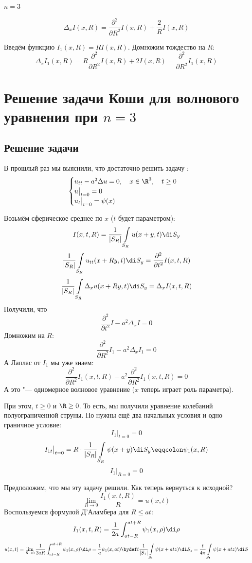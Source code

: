 \begin{statement}
	$ n = 3 $

	$$ \Delta_x I(x, R) = \frac{\partial^2}{\partial R^2} I(x, R) + \frac2R I(x, R) $$

	Введём функцию $ I_1(x, R) = R I(x, R) $.
	Домножим тождество на $ R $:
	$$ \Delta_x I_1(x, R) = R \frac{\partial^2}{\partial R^2} I(x, R) + 2I(x, R) =
	\frac{\partial^2}{\partial R^2} I_1(x, R) $$
\end{statement}

\section{Решение задачи Коши для волнового уравнения при \texorpdfstring{$ n = 3 $}{n = 3}}

\subsection{Решение задачи }

В прошлый раз мы выяснили, что достаточно решить задачу :
$$
\begin{cases}
	u_{tt} - a^2 \Delta u = 0, \quad x \in \R^3, \quad t \ge 0 \\
	u\bigr|_{t = 0} = 0 \\
	u_t\bigr|_{t = 0} = \psi(x)
\end{cases} $$

Возьмём сферическое среднее по $ x $ ($ t $ будет параметром):
$$ I(x, t, R) = \frac1{|S_R|} \int\limits_{S_R} u(x + y, t) \di S_y $$
$$ \frac1{|S_R|} \int\limits_{S_R} u_{tt} (x + Ry, t) \di S_y =
\frac{\partial^2}{\partial t^2} I(x, t, R) $$
$$ \frac1{|S_R|} \int\limits_{S_R} \Delta_x u(x + Ry, t) \di S_y = \Delta_x I(x, t, R) $$
Получили, что
$$ \frac{\partial^2}{\partial t^2} I - a^2 \Delta_x I = 0 $$
Домножим на $ R $:
$$ \frac{\partial^2}{\partial R^2} I_1 - a^2 \Delta_x I_1 = 0 $$
А Лаплас от $ I_1 $ мы уже знаем:
$$ \frac{\partial^2}{\partial R^2} I_1(x, t, R) -
a^2 \frac{\partial^2}{\partial R^2} I_1 (x, t, R) = 0 $$
А это "--- одномерное волновое уравнение ($ x $ теперь играет роль параметра).

При этом, $ t \ge 0 $ и $ \R \ge 0 $.
То есть, мы получили уравнение колебаний полуограниченной струны.
Но нужны ещё два начальных условия и одно граничное условие:
$$ I_1\bigr|_{t = 0} = 0 $$
$$ I_{1t}\bigr|_{t = 0} = R \cdot \frac1{|S_R|} \int\limits_{S_R} \psi(x + y) \di S_y \eqqcolon
\psi_1(x, R) $$
$$ I_1\bigr|_{R = 0} = 0 $$

Предположим, что мы эту задачу решили.
Как теперь вернуться к исходной?
$$ \lim\limits_{R \to 0} \frac{I_1(x, t, R)}R = u(x, t) $$
Воспользуемся формулой Д'Аламбера для $ R \le at $:
$$ I_1(x, t, R) = \frac1{2a} \int_{at - R}^{at + R} \psi_1(x, \rho) \di \rho $$
$$ u(x, t) = \lim\limits_{R \to 0} \frac1{2aR} \int_{at - R}^{at + R} \psi_1(x, \rho) \di \rho =
\frac1a \psi_1(x, at) \bydef t \frac1{|S_1|} \int\limits_{S_1} \psi(x + atz) \di S_z =
\frac{t}{4 \pi} \int\limits_{S_1} \psi(x + atz) \di S $$

